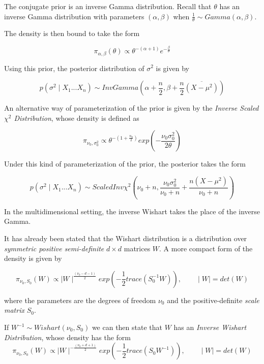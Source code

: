 \documentclass[12pt,openright,twoside,a4paper]{book}
\begin{document}
The conjugate prior is an inverse Gamma distribution. Recall that $\theta$ has an inverse Gamma distribution with parameters $(\alpha,\beta)$   when $\frac{1}{\theta}\sim Gamma(\alpha,\beta)$.

The density is then bound to take the form 

\begin{equation}
\pi_{\alpha,\beta}(\theta)\propto \theta^{-(\alpha+1)}e^{-\frac{\beta}{\theta}}
\end{equation}

Using this prior, the posterior distribution of $\sigma^2$ is given by

\begin{equation}
p( \sigma^2 \mid X_1...X_n)\sim InvGamma(\alpha + \frac{n}{2}, \beta + \frac{n}{2} \overline{(X-\mu^2)})
\end{equation}

An alternative way of parameterization of the prior is given by the \textit{Inverse Scaled $\chi^2$ Distribution}, whose density is defined as

\begin{equation}
\pi_{\nu_0, \sigma_0^2}\propto \theta^{-(1+ \frac{n_0}{2})}exp(-\frac{\nu_0 \sigma_0^2}{2\theta})
\end{equation}

Under this kind of parameterization of the prior, the posterior takes the form

\begin{equation}
p(\sigma^2 \mid X_1...X_n)\sim ScaledInv\chi^2(\nu_0+n, \frac{\nu_0 \sigma_0^2}{\nu_0 + n} + \frac{n(X-\mu^2)}{\nu_0 + n})
\end{equation}

In the multidimensional setting, the inverse Wishart takes the place of the inverse Gamma.

It has already been stated that the Wishart distribution is a distribution over \textit{symmetric positive semi-definite} $d\times d$ matrices $W$. A more compact form of the density is given by

\begin{equation}
\pi_{\nu_0, S_0}(W)\propto \mid W\mid ^{\frac{(\nu_0-d-1)}{2}}exp(-\frac{1}{2}trace(S_0^{-1}W)), \qquad \mid W\mid=det(W)
\end{equation}

where the parameters are the degrees of freedom $\nu_0$ and the positive-definite \textit{scale matrix}
$S_0$.

If $W^{-1}\sim Wishart(\nu_0, S_0)$ we can then state that $W$ has an \textit{Inverse Wishart Distribution}, whose density has the form
\begin{equation}
\pi_{\nu_0, S_0}(W)\propto \mid W\mid ^{-\frac{(\nu_0+d+1)}{2}}exp(-\frac{1}{2}trace(S_0W^{-1})), \qquad \mid W\mid=det(W)
\end{equation}
\end{document}
